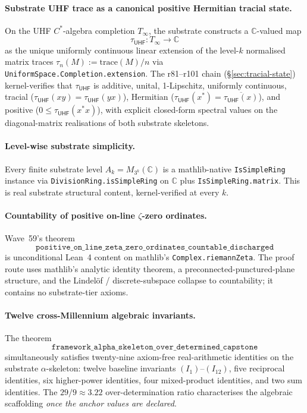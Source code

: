\documentclass[11pt,a4paper]{amsart}
\theoremstyle{plain}
\theoremstyle{definition}
\begin{document}
\paragraph{Substrate UHF trace as a canonical positive Hermitian tracial state.} On the UHF $C^*$-algebra completion $T_\infty$, the substrate constructs a $\mathbb{C}$-valued map
\[
\tau_{\textsf{UHF}} \colon T_\infty \to \mathbb{C}
\]
as the unique uniformly continuous linear extension of the level-$k$ normalised matrix traces $\tau_n(M) := \mathrm{trace}(M)/n$ via \texttt{UniformSpace.Completion.extension}. The r81--r101 chain (\S\ref{sec:tracial-state}) kernel-verifies that $\tau_{\textsf{UHF}}$ is additive, unital, 1-Lipschitz, uniformly continuous, tracial ($\tau_{\textsf{UHF}}(xy) = \tau_{\textsf{UHF}}(yx)$), Hermitian ($\tau_{\textsf{UHF}}(x^*) = \overline{\tau_{\textsf{UHF}}(x)}$), and positive ($0 \le \tau_{\textsf{UHF}}(x^*x)$), with explicit closed-form spectral values on the diagonal-matrix realisations of both substrate skeletons.

\paragraph{Level-wise substrate simplicity.} Every finite substrate level $A_k = M_{3^k}(\mathbb{C})$ is a mathlib-native \texttt{IsSimpleRing} instance via \texttt{DivisionRing.isSimpleRing} on $\mathbb{C}$ plus \texttt{IsSimpleRing.matrix}. This is real substrate structural content, kernel-verified at every $k$.

\paragraph{Countability of positive on-line $\zeta$-zero ordinates.} Wave~59's theorem
\[
\texttt{positive\_on\_line\_zeta\_zero\_ordinates\_countable\_discharged}
\]
is unconditional Lean~4 content on mathlib's \texttt{Complex.riemannZeta}. The proof route uses mathlib's analytic identity theorem, a preconnected-punctured-plane structure, and the Lindel\"of / discrete-subspace collapse to countability; it contains no substrate-tier axioms.

\paragraph{Twelve cross-Millennium algebraic invariants.} The theorem
\[
\texttt{framework\_alpha\_skeleton\_over\_determined\_capstone}
\]
simultaneously satisfies twenty-nine axiom-free real-arithmetic identities on the substrate $\alpha$-skeleton: twelve baseline invariants $(I_1)$--$(I_{12})$, five reciprocal identities, six higher-power identities, four mixed-product identities, and two sum identities. The $29/9 \approx 3.22$ over-determination ratio characterises the algebraic scaffolding \emph{once the anchor values are declared}.
\end{document}
